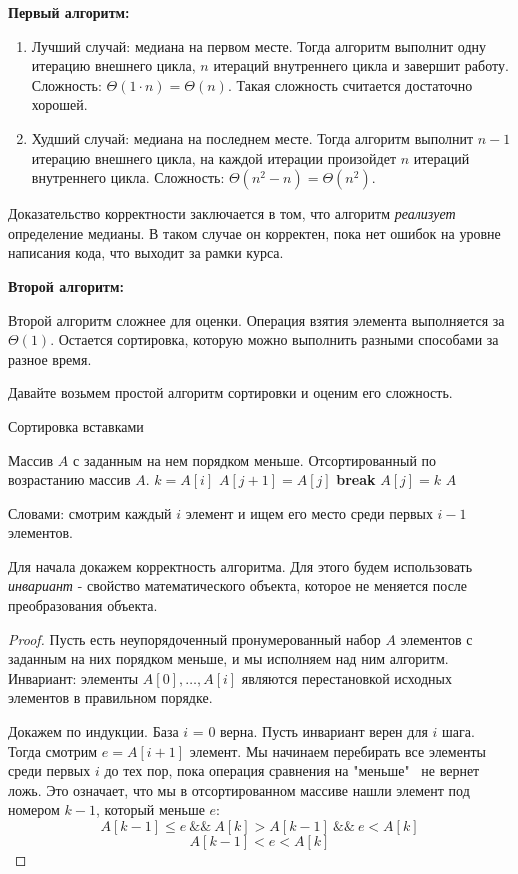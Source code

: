 \documentclass[../book.tex]{subfiles}
\begin{document}
	\textbf{Первый алгоритм:}
	\begin{enumerate}
		\item Лучший случай: медиана на первом месте. Тогда алгоритм выполнит одну итерацию внешнего цикла, $n$ итераций внутреннего цикла и завершит работу. Сложность: $\Theta(1 \cdot n) = \Theta(n)$. Такая сложность считается достаточно хорошей.
		\item Худший случай: медиана на последнем месте. Тогда алгоритм выполнит $n - 1$ итерацию внешнего цикла, на каждой итерации произойдет $n$ итераций внутреннего цикла. Сложность: $\Theta(n^2 - n) = \Theta(n^2)$. 
	\end{enumerate}
	
	Доказательство корректности заключается в том, что алгоритм \textit{реализует} определение медианы. В таком случае он корректен, пока нет ошибок на уровне написания кода, что выходит за рамки курса.
	
	\textbf{Второй алгоритм:}
	
	Второй алгоритм сложнее для оценки. Операция взятия элемента выполняется за $\Theta(1)$. Остается сортировка, которую можно выполнить разными способами за разное время. 
	
	Давайте возьмем простой алгоритм сортировки и оценим его сложность.
	
	\begin{algorithm}
		\caption{Сортировка вставками}
		\begin{algorithmic}[1]
			\Require Массив $A$ с заданным на нем порядком меньше.
			\Ensure Отсортированный по возрастанию массив $A$.
					\State $k = A[i]$
							\State $A[j+1] = A[j]$
						\Else
							\State \textbf{break}
						\EndIf
					\EndFor
					\State $A[j] = k$
				\EndFor
				\State \Return $A$
			\EndFunction
		\end{algorithmic}
	\end{algorithm}
	
	Словами: смотрим каждый $i$ элемент и ищем его место среди первых $i-1$ элементов.
	
	Для начала докажем корректность алгоритма. Для этого будем использовать \textit{инвариант} - свойство математического объекта, которое не меняется после преобразования объекта. 
	\begin{proof}
		Пусть есть неупорядоченный пронумерованный набор $A$ элементов с заданным на них порядком меньше, и мы исполняем над ним алгоритм. Инвариант: элементы $A[0], \ldots, A[i]$ являются перестановкой исходных элементов в правильном порядке.
		
		Докажем по индукции. База $i$ = 0 верна. Пусть инвариант верен для $i$ шага. Тогда смотрим $e = A[i+1]$ элемент. Мы начинаем перебирать все элементы среди первых $i$ до тех пор, пока операция сравнения на "меньше" \ не вернет ложь. Это означает, что мы в отсортированном массиве нашли элемент под номером $k - 1$, который меньше $e$:
		\[
		A[k-1] \leqslant e \ \&\& \ A[k] > A[k-1] \ \&\& \ e < A[k]
		\]
		\[
		A[k-1] < e < A[k]
		\]
	\end{proof}
	
\end{document}

